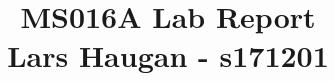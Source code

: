 \documentclass[11pt,english,a4paper] {report}
\begin{document}
\title{  MS016A Lab Report\\ Lars Haugan - s171201 }

\allsectionsfont{\sffamily}
\selectfont
\maketitle

\tableofcontents{}




\end{document}
